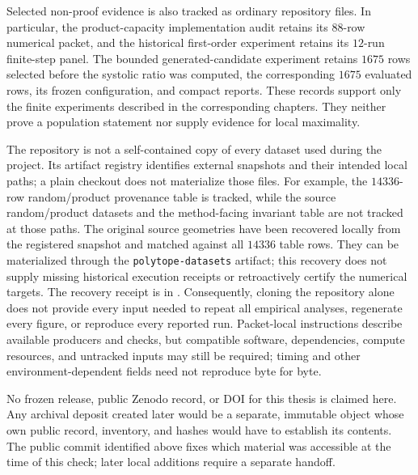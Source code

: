 Selected non-proof evidence is also tracked as ordinary repository files.  In
particular, the product-capacity implementation audit retains its \(88\)-row
numerical packet, and the historical first-order experiment retains its
\(12\)-run finite-step panel.  The bounded generated-candidate experiment
retains \(1675\) rows selected before the systolic ratio was computed, the
corresponding \(1675\) evaluated rows, its frozen configuration, and compact
reports.  These records support only the finite experiments described in the
corresponding chapters.  They neither prove a population statement nor supply
evidence for local maximality.

The repository is not a self-contained copy of every dataset used during the
project.  Its artifact registry identifies external snapshots and their intended
local paths; a plain checkout does not materialize those files.  For example, the
\(14336\)-row random/product provenance table is tracked, while the source
random/product datasets and the method-facing invariant table are not tracked
at those paths. The original source geometries have been recovered locally
from the registered snapshot and matched against all \(14336\) table rows.
They can be materialized through the \texttt{polytope-datasets} artifact;
this recovery does not supply missing historical execution receipts or
retroactively certify the numerical targets. The recovery receipt is in
.
Consequently, cloning the repository alone does not provide every input needed
to repeat all empirical analyses, regenerate every figure, or reproduce every
reported run.  Packet-local instructions describe available producers and
checks, but compatible software, dependencies, compute resources, and
untracked inputs may still be required; timing and other
environment-dependent fields need not reproduce byte for byte.

No frozen release, public Zenodo record, or DOI for this thesis is claimed
here.  Any archival deposit created later would be a separate, immutable
object whose own public record, inventory, and hashes would have to establish
its contents.  The public commit identified above fixes which material was accessible
at the time of this check; later local additions require a separate handoff.
